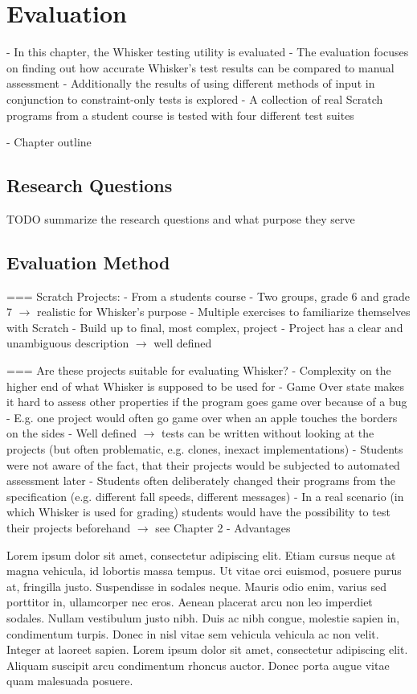 \chapter{Evaluation}%
\label{cha:evaluation}

- In this chapter, the Whisker testing utility is evaluated
- The evaluation focuses on finding out how accurate Whisker's test results can be compared to manual assessment
- Additionally the results of using different methods of input in conjunction to constraint-only tests is explored
- A collection of real Scratch programs from a student course is tested with four different test suites

- Chapter outline

\section{Research Questions}

TODO summarize the research questions and what purpose they serve

\section{Evaluation Method}

=== Scratch Projects:
- From a students course
- Two groups, grade 6 and grade 7 $\rightarrow$ realistic for Whisker's purpose
- Multiple exercises to familiarize themselves with Scratch
- Build up to final, most complex, project
- Project has a clear and unambiguous description $\rightarrow$ well defined

=== Are these projects suitable for evaluating Whisker?
- Complexity on the higher end of what Whisker is supposed to be used for
- Game Over state makes it hard to assess other properties if the program goes game over because of a bug
    - E.g. one project would often go game over when an apple touches the borders on the sides
    - Well defined $\rightarrow$ tests can be written without looking at the projects (but often problematic, e.g. clones, inexact implementations)
- Students were not aware of the fact, that their projects would be subjected to automated assessment later
    - Students often deliberately changed their programs from the specification (e.g. different fall speeds, different messages)
    - In a real scenario (in which Whisker is used for grading) students would have the possibility to test their projects beforehand
    $\rightarrow$ see Chapter 2 - Advantages

\parspace
Lorem ipsum dolor sit amet, consectetur adipiscing elit. Etiam cursus neque at magna vehicula, id lobortis massa tempus. Ut vitae orci euismod, posuere purus at, fringilla justo. Suspendisse in sodales neque. Mauris odio enim, varius sed porttitor in, ullamcorper nec eros. Aenean placerat arcu non leo imperdiet sodales. Nullam vestibulum justo nibh. Duis ac nibh congue, molestie sapien in, condimentum turpis. Donec in nisl vitae sem vehicula vehicula ac non velit. Integer at laoreet sapien. Lorem ipsum dolor sit amet, consectetur adipiscing elit. Aliquam suscipit arcu condimentum rhoncus auctor. Donec porta augue vitae quam malesuada posuere.

